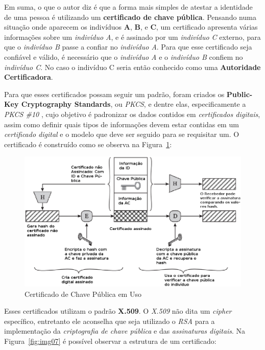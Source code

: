 	Em suma, o que o autor diz é que a forma mais simples de atestar a identidade de uma pessoa é utilizando um \textbf{certificado de chave pública}. Pensando numa situação onde aparecem os indivíduos \textbf{A}, \textbf{B}, e \textbf{C}, um certificado apresenta várias informações sobre um \textit{indivíduo A}, e é assinado por um \textit{indivíduo C} externo, para que o \textit{indivíduo B} passe a confiar no \textit{indivíduo A}. Para que esse certificado seja confiável e válido, é necessário que o \textit{indivíduo A} e o \textit{indivíduo B} confiem no \textit{indivíduo C}. No caso o indivíduo C seria então conhecido como uma \textbf{Autoridade Certificadora}.

	Para que esses certificados possam seguir um padrão, foram criados os \textbf{Public-Key Cryptography Standards}, ou \textit{PKCS}, e dentre elas, especificamente a \textit{PKCS \#10} \cite{pkcs10}, cujo objetivo é padronizar os dados contidos em \textit{certificados digitais}, assim como definir quais tipos de informações devem estar contidas em um \textit{certificado digital} e o modelo que deve ser seguido para se requisitar um. O certificado é construído como se observa na Figura~\ref{fig:img06}:

	\begin{figure}[h]
		\centering
		\includegraphics[keepaspectratio=true,scale=0.46]{figuras/img05.eps}
		\caption{Certificado de Chave Pública em Uso \cite[p.~430]{stallings11}}
		\label{fig:img06}
	\end{figure}
 
	Esses certificados utilizam o padrão \textbf{X.509}. O \textit{X.509} não dita um \textit{cipher} específico, entretanto ele aconselha que seja utilizado o \textit{RSA} para a implementação da \textit{criptografia de chave pública} e das \textit{assinaturas digitais}. Na Figura~\ref{fig:img07} é possível observar a estrutura de um certificado:


